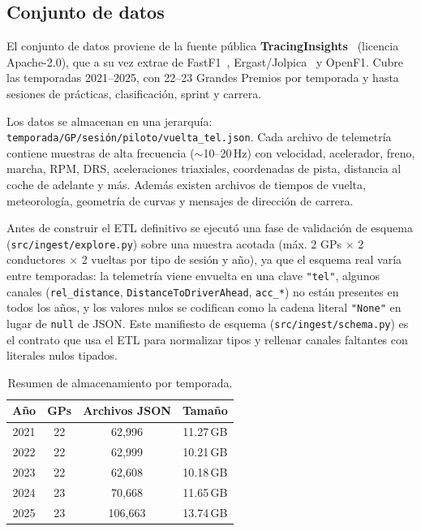 \documentclass[conference]{IEEEtran}
\begin{document}
\subsection{Conjunto de datos}

El conjunto de datos proviene de la fuente pública
\textbf{TracingInsights}~\cite{tracinginsights} (licencia Apache-2.0),
que a su vez extrae de FastF1~\cite{fastf1}, Ergast/Jolpica~\cite{jolpica}
y OpenF1. Cubre las temporadas 2021–2025, con 22–23 Grandes Premios por
temporada y hasta sesiones de prácticas, clasificación, sprint y carrera.

Los datos se almacenan en una jerarquía:
\texttt{temporada/GP/sesión/piloto/vuelta\_tel.json}. Cada archivo de
telemetría contiene muestras de alta frecuencia ($\sim$10–20\,Hz) con
velocidad, acelerador, freno, marcha, RPM, DRS, aceleraciones triaxiales,
coordenadas de pista, distancia al coche de adelante y más. Además existen
archivos de tiempos de vuelta, meteorología, geometría de curvas y mensajes
de dirección de carrera.

Antes de construir el ETL definitivo se ejecutó una fase de validación de
esquema (\texttt{src/ingest/explore.py}) sobre una muestra acotada
(máx. 2 GPs $\times$ 2 conductores $\times$ 2 vueltas por tipo de sesión y
año), ya que el esquema real varía entre temporadas: la telemetría viene
envuelta en una clave \texttt{"tel"}, algunos canales
(\texttt{rel\_distance}, \texttt{DistanceToDriverAhead}, \texttt{acc\_*})
no están presentes en todos los años, y los valores nulos se codifican
como la cadena literal \texttt{"None"} en lugar de \texttt{null} de JSON.
Este manifiesto de esquema (\texttt{src/ingest/schema.py}) es el contrato
que usa el ETL para normalizar tipos y rellenar canales faltantes con
literales nulos tipados.

\begin{table}[!htbp]
\centering
\caption{Resumen de almacenamiento por temporada.}
\label{tab:resumen}
\begin{tabular}{@{}cccc@{}}
\toprule
\textbf{Año} & \textbf{GPs} & \textbf{Archivos JSON} & \textbf{Tamaño} \\
\midrule
2021 & 22 & 62{,}996 & 11.27\,GB \\
2022 & 22 & 62{,}999 & 10.21\,GB \\
2023 & 22 & 62{,}608 & 10.18\,GB \\
2024 & 23 & 70{,}668 & 11.65\,GB \\
2025 & 23 & 106{,}663 & 13.74\,GB \\
\bottomrule
\end{tabular}
\end{table}
\end{document}
